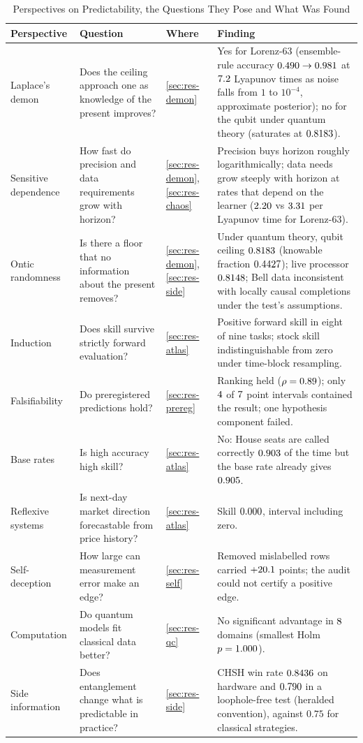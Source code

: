 \documentclass[journal]{IEEEtran}
\theoremstyle{definition}
\begin{document}
\begin{table}[!t]
\caption{Perspectives on Predictability, the Questions They Pose and What Was Found}
\label{tab:persp}
\centering
\footnotesize
\renewcommand{\arraystretch}{1.12}
\begin{tabular}{@{}p{}p{}p{}p{}@{}}
\toprule
Perspective & Question & Where & Finding\\
\midrule
Laplace's demon & Does the ceiling approach one as knowledge of the present improves? & \ref{sec:res-demon} & Yes for Lorenz-63 (ensemble-rule accuracy $0.490\to0.981$ at $7.2$ Lyapunov times as noise falls from $1$ to $10^{-4}$, approximate posterior); no for the qubit under quantum theory (saturates at $0.8183$).\\
Sensitive dependence & How fast do precision and data requirements grow with horizon? & \ref{sec:res-demon}, \ref{sec:res-chaos} & Precision buys horizon roughly logarithmically; data needs grow steeply with horizon at rates that depend on the learner ($2.20$ vs $3.31$ per Lyapunov time for Lorenz-63).\\
Ontic randomness & Is there a floor that no information about the present removes? & \ref{sec:res-demon}, \ref{sec:res-side} & Under quantum theory, qubit ceiling $0.8183$ (knowable fraction $0.4427$); live processor $0.8148$; Bell data inconsistent with locally causal completions under the test's assumptions.\\
Induction & Does skill survive strictly forward evaluation? & \ref{sec:res-atlas} & Positive forward skill in eight of nine tasks; stock skill indistinguishable from zero under time-block resampling.\\
Falsifiability & Do preregistered predictions hold? & \ref{sec:res-prereg} & Ranking held ($\rho=0.89$); only $4$ of $7$ point intervals contained the result; one hypothesis component failed.\\
Base rates & Is high accuracy high skill? & \ref{sec:res-atlas} & No: House seats are called correctly $0.903$ of the time but the base rate already gives $0.905$.\\
Reflexive systems & Is next-day market direction forecastable from price history? & \ref{sec:res-atlas} & Skill $0.000$, interval including zero.\\
Self-deception & How large can measurement error make an edge? & \ref{sec:res-self} & Removed mislabelled rows carried $+20.1$ points; the audit could not certify a positive edge.\\
Computation & Do quantum models fit classical data better? & \ref{sec:res-qc} & No significant advantage in $8$ domains (smallest Holm $p=1.000$).\\
Side information & Does entanglement change what is predictable in practice? & \ref{sec:res-side} & CHSH win rate $0.8436$ on hardware and $0.790$ in a loophole-free test (heralded convention), against $0.75$ for classical strategies.\\
\bottomrule
\end{tabular}
\end{table}
\end{document}
